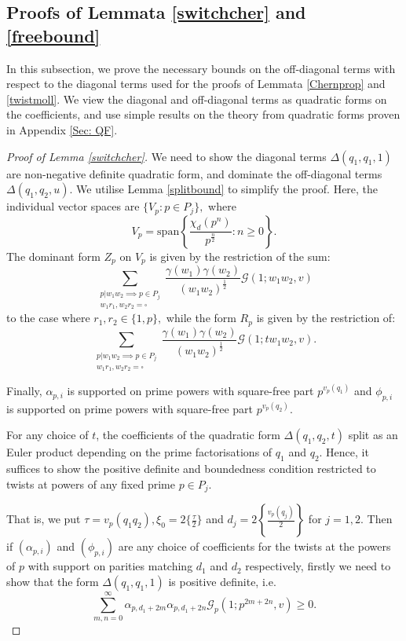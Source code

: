 \documentclass[12pt]{amsart}
\numberwithin{equation}{section}
\numberwithin{thm}{section}
\newcommand{\1}{\mathbf 1}
\begin{document}
	\subsection{Proofs of Lemmata \ref{switchcher} and  \ref{freebound}}\label{Lemsec}
	In this subsection, we prove the necessary bounds on the off-diagonal terms with respect to the diagonal terms used for the proofs of Lemmata \ref{Chernprop} and \ref{twistmoll}. We view the diagonal and off-diagonal terms as quadratic forms on the coefficients, and use simple results on the theory from quadratic forms proven in Appendix \ref{Sec: QF}.
	\begin{proof}[Proof of Lemma \ref{switchcher}]
		We need to show the diagonal terms $\Delta(q_1,q_1,1)$ are non-negative definite quadratic form, and dominate the off-diagonal terms $\Delta(q_1,q_2,u).$ We utilise  Lemma \ref{splitbound} to simplify the proof.
		Here, the individual vector spaces are $\{V_p: p\in P_j\},$ where $$V_p=\text{span}\left\{\frac{\chi_d(p^n)}{p^{\frac{n}{2}}}: n\ge 0\right\}.$$ The dominant form $Z_p$ on $V_p$
		is given by the restriction of the sum: \begin{equation}\sum_{\substack{p|w_1w_2\implies p\in P_{j}\\ w_1r_1,w_2r_2=\square}}\frac{\gamma(w_1)\gamma(w_2)}{(w_1w_2)^{\frac{1}{2}}} \mathcal{G}(1;w_1w_2,v)\end{equation}
		to the case where $r_1,r_2\in\{1,p\},$ while the form $R_p$ is given by the restriction of: \begin{equation}\sum_{\substack{p|w_1w_2\implies p\in P_{j}\\ w_1r_1,w_2r_2=\square}}\frac{\gamma(w_1)\gamma(w_2)}{(w_1w_2)^{\frac{1}{2}}} \mathcal{G}(1;tw_1w_2,v).\end{equation} 
		
		Finally, $\alpha_{p,i}$ is supported  on prime powers with square-free part $p^{v_p(q_1)}$ and $\phi_{p,i}$ is supported  on prime powers with square-free part $p^{v_p(q_2)}.$ 
		
		For any choice of $t$, the coefficients of the quadratic form $\Delta(q_1,q_2,t)$  split  as an Euler product depending on the prime factorisations of $q_1$ and $q_2$. Hence, it suffices to show the positive definite and boundedness condition restricted to twists at powers of any fixed prime $p\in P_{j}$.
		
		That is, we put $\tau=v_p(q_1q_2),\xi_0=2\{\frac{\tau}{2}\}$ and $ d_j=2\left\{\frac{v_p(q_j)}{2}\right\}$ for $j=1,2$. Then if   $(\alpha_{p,i})$ and $(\phi_{p,i})$ are any choice of coefficients for the twists at the powers of $p$ with support on parities matching  $d_1$ and $d_2$ respectively, firstly we need to show that the form $\Delta(q_1,q_1,1)$ is positive definite, i.e. \begin{equation}\label{posdef}
			\sum^{\infty}_{m,n=0}\alpha_{p,d_1+2m}\alpha_{p,d_1+2n}  \mathcal{G}_p(1;p^{2m+2n},v)\ge 0.\end{equation}
		

\end{proof}
\end{document}
